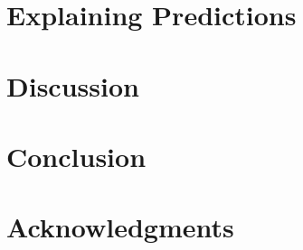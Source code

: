 \documentclass[12pt]{report}
\begin{document}
\chapter{Explaining Predictions}


\chapter{Discussion}


\chapter{Conclusion}




\chapter*{Acknowledgments}







%
\end{document}
